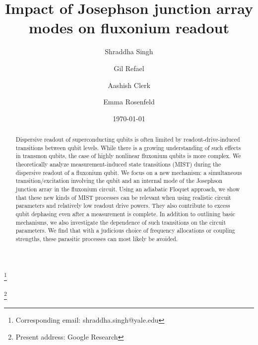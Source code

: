 \documentclass[%
reprint,
superscriptaddress,
 amsmath,amssymb,
 aps,
 prx,
longbibliography,
floatfix,
]{revtex4-2}
\begin{document}
\title{Impact of Josephson junction array modes on fluxonium readout}

\author{Shraddha Singh}\thanks{Corresponding email: shraddha.singh@yale.edu}
\author{Gil Refael}
\author{Aashish Clerk}
\author{Emma Rosenfeld}\thanks{Present address: Google Research}
\date{\today}%

\begin{abstract}

    Dispersive readout of superconducting qubits is often limited by readout-drive-induced transitions between qubit levels. While there is a growing understanding of such effects in transmon qubits, the case of highly nonlinear fluxonium qubits is more complex. We theoretically analyze measurement-induced state transitions (MIST) during the dispersive readout of a fluxonium qubit. We focus on a new mechanism: a simultaneous transition/excitation involving the qubit and an internal mode of the Josephson junction array in the fluxonium circuit. Using an adiabatic Floquet approach, we show that these new kinds of MIST processes can be relevant when using realistic circuit parameters and relatively low readout drive powers. They also contribute to excess qubit dephasing even after a measurement is complete. In addition to outlining basic mechanisms, we also investigate the dependence of such transitions on the circuit parameters. We find that with a judicious choice of frequency allocations or coupling strengths, these parasitic processes can most likely be avoided.
\end{abstract}

\maketitle
\end{document}
